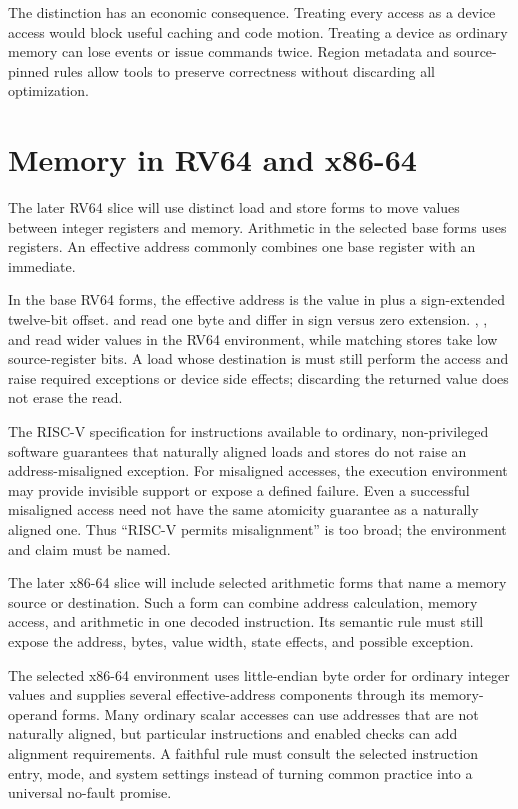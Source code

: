 The distinction has an economic consequence. Treating every access as a
device access would block useful caching and code motion. Treating a device as
ordinary memory can lose events or issue commands twice. Region metadata and
source-pinned rules allow tools to preserve correctness without discarding all
optimization.

\section{Memory in RV64 and x86-64}

The later RV64 slice will use distinct load and store forms to move values
between integer registers and memory. Arithmetic in the selected base forms
uses registers. An effective address commonly combines one base register with
an immediate.

In the base RV64 forms, the effective address is the value in  plus
a sign-extended twelve-bit offset.  and  read one byte and
differ in sign versus zero extension. , , and 
read wider values in the RV64 environment, while matching stores take low
source-register bits. A load whose destination is  must still perform
the access and raise required exceptions or device side effects; discarding
the returned value does not erase the read. \autocite{riscv2026unpriv}

The RISC-V specification for instructions available to ordinary, non-privileged
software guarantees that naturally aligned loads
and stores do not raise an address-misaligned exception. For misaligned
accesses, the execution environment may provide invisible support or expose a
defined failure. Even a successful misaligned access need not have the same
atomicity guarantee as a naturally aligned one. Thus ``RISC-V permits
misalignment'' is too broad; the environment and claim must be named.

The later x86-64 slice will include selected arithmetic forms that name a
memory source or destination. Such a form can combine address calculation,
memory access, and arithmetic in one decoded instruction. Its semantic rule
must still expose the address, bytes, value width, state effects, and possible
exception.

The selected x86-64 environment uses little-endian byte order for ordinary
integer values and supplies several effective-address components through its
memory-operand forms. Many ordinary scalar accesses can use addresses that are
not naturally aligned, but particular instructions and enabled checks can add
alignment requirements. A faithful rule must consult the selected instruction
entry, mode, and system settings instead of turning common practice into a
universal no-fault promise. \autocite{intel2026sdm1,intel2026sdm2}


